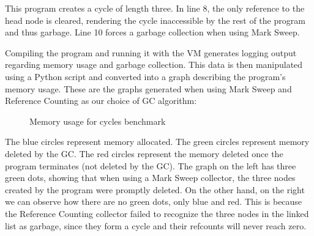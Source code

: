 \documentclass[10pt]{extarticle}
\begin{document}
This program creates a cycle of length three. In line 8, the only reference to the head node is cleared, rendering the cycle inaccessible by the rest of the program and thus garbage. Line 10 forces a garbage collection when using Mark Sweep.

\medskip
Compiling the program and running it with the VM generates logging output regarding memory usage and garbage collection. This data is then manipulated using a Python script and converted into a graph describing the program's memory usage. These are the graphs generated when using Mark Sweep and Reference Counting as our choice of GC algorithm:

\newpage

\begin{figure}[h]%
    \centering
    \qquad
    \caption{Memory usage for cycles benchmark}
\end{figure}

The blue circles represent memory allocated. The green circles represent memory deleted by the GC. The red circles represent the memory deleted once the program terminates (not deleted by the GC). The graph on the left has three green dots, showing that when using a Mark Sweep collector, the three nodes created by the program were promptly deleted. On the other hand, on the right we can observe how there are no green dots, only blue and red. This is because the Reference Counting collector failed to recognize the three nodes in the linked list as garbage, since they form a cycle and their refcounts will never reach zero. 
\end{document}

